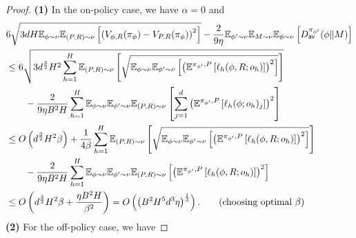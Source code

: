 \begin{proof}
\textbf{(1)} In the on-policy case, we have $\alpha = 0$ and 
\begin{align*}
      &6\sqrt{3dH\mathbb{E}_{\phi \sim \nu}\mathbb{E}_{(P,R) \sim \nu}\left[\left(V_{\phi, R}(\pi_{\phi}) - V_{P,R}(\pi_{\phi}) \right)^2\right]}   - \frac{2}{9\eta}\mathbb{E}_{\phi' \sim \nu}\mathbb{E}_{M \sim \nu}\mathbb{E}_{\phi \sim \nu}\left[D_{\mathsf{av}}^{\pi_{\phi'}}(\phi\|M)\right] 
      \\&\le  6\sqrt{3d^{\frac{3}{2}}H^2\sum_{h=1}^H\mathbb{E}_{(P,R) \sim \nu}\left[\sqrt{\mathbb{E}_{\phi \sim \nu}\mathbb{E}_{\phi' \sim \nu}\left[\left(  \mathbb{E}^{\pi_{\phi'}, P}\left[\ell_h(\phi, R; o_h)\right]\right)^2\right]}\right]}
      \\&\qquad - \frac{2}{9\eta B^2H}\sum_{h=1}^H \mathbb{E}_{\phi \sim \nu}\mathbb{E}_{\phi' \sim \nu}\mathbb{E}_{(P,R) \sim \nu} \left[\sum_{j=1}^d\left( \mathbb{E}^{\pi_{\phi'}, P}\left[ \ell_h(\phi; o_h)_j\right]\right)^2\right]
      \\&\le O\left(d^{\frac{3}{2}}H^2\beta\right) + \frac{1}{4\beta}\sum_{h=1}^H\mathbb{E}_{(P,R) \sim \nu}\left[\sqrt{\mathbb{E}_{\phi \sim \nu}\mathbb{E}_{\phi' \sim \nu}\left[\left(  \mathbb{E}^{\pi_{\phi'}, P}\left[\ell_h(\phi, R; o_h)\right]\right)^2\right]}\right] 
      \\&\qquad - \frac{2}{9\eta B^2 H}\sum_{h=1}^H \mathbb{E}_{\phi \sim \nu}\mathbb{E}_{\phi' \sim \nu}\mathbb{E}_{(P,R) \sim \nu} \left[\left( \mathbb{E}^{\pi_{\phi'}, P}\left[\ell_h(\phi, R ; o_h)\right]\right)^2\right]
      \\&\le O\left(d^{\frac{3}{2}}H^2\beta + \frac{\eta B^2H }{\beta^2}\right) = O\left(\left( B^2H^5d^3 \eta \right)^{\frac{1}{3}}\right).  \tag{choosing optimal $\beta$}
\end{align*}
\textbf{(2)} For the off-policy case, we have %

\end{proof}
